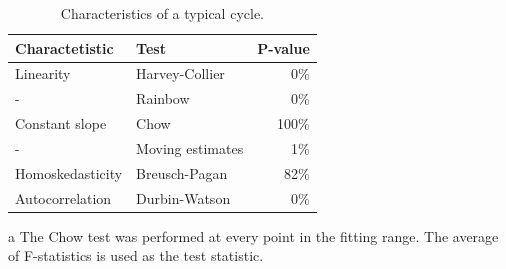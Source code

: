 \documentclass[reprint]{revtex4-1}
\begin{document}
\begin{table}[h]
\centering
\begin{threeparttable}
	\caption{Characteristics of a typical cycle.\label{tbl:CycleChars}}
	\begin{tabular}{llr}
	\hline\hline
	Charactetistic	& Test 					& P-value \\
	\hline
	Linearity 		& Harvey-Collier		& 0\% \\
	-				& Rainbow				& 0\% \\
	Constant slope	& Chow\tnote{a}		 	& 100\% \\
	-				& Moving estimates		& 1\% \\
	Homoskedasticity& Breusch-Pagan 		& 82\% \\
	Autocorrelation & Durbin-Watson			& 0\% \\
	\hline\hline
	\end{tabular}
	\begin{tablenotes}
	\item[a]{The Chow test was performed at every point in the fitting range. The average of F-statistics is used as the test statistic.}
	\end{tablenotes}
\end{threeparttable}
\end{table}
\end{document}
